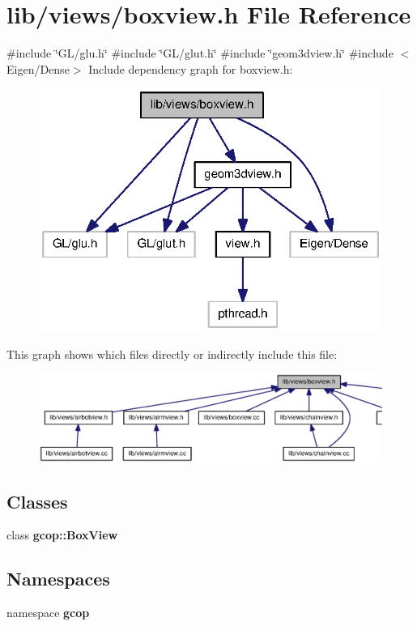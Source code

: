 \section{lib/views/boxview.h \-File \-Reference}
\label{boxview_8h}
{\ttfamily \#include \char`\"{}\-G\-L/glu.\-h\char`\"{}}\*
{\ttfamily \#include \char`\"{}\-G\-L/glut.\-h\char`\"{}}\*
{\ttfamily \#include \char`\"{}geom3dview.\-h\char`\"{}}\*
{\ttfamily \#include $<$\-Eigen/\-Dense$>$}\*
\-Include dependency graph for boxview.\-h\-:
\nopagebreak
\begin{figure}[H]
\begin{center}
\leavevmode
\includegraphics[width=322pt]{boxview_8h__incl}
\end{center}
\end{figure}
\-This graph shows which files directly or indirectly include this file\-:
\nopagebreak
\begin{figure}[H]
\begin{center}
\leavevmode
\includegraphics[width=350pt]{boxview_8h__dep__incl}
\end{center}
\end{figure}
\subsection*{\-Classes}
\begin{DoxyCompactItemize}
\item 
class {\bf gcop\-::\-Box\-View}
\end{DoxyCompactItemize}
\subsection*{\-Namespaces}
\begin{DoxyCompactItemize}
\item 
namespace {\bf gcop}
\end{DoxyCompactItemize}
